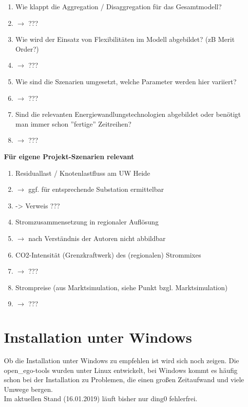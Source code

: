 \documentclass[
a4paper,     %
12pt         %
]{scrartcl}  %
\begin{document}
\begin{enumerate}
	\item Wie klappt die Aggregation / Disaggregation für das Gesamtmodell?
	\item[] $\rightarrow$ ???
	\item Wie wird der Einsatz von Flexibilitäten im Modell abgebildet? (zB Merit Order?)
	\item[] $\rightarrow$ ???
	\item Wie sind die Szenarien umgesetzt, welche Parameter werden hier variiert?
	\item[] $\rightarrow$ ???
	\item Sind die relevanten Energiewandlungstechnologien abgebildet oder benötigt man immer schon ''fertige'' Zeitreihen?
	\item[] $\rightarrow$ ???
\end{enumerate}


\textbf{Für eigene Projekt-Szenarien relevant}
\begin{enumerate}
	\item Residuallast / Knotenlastfluss am UW Heide
	\item[] $\rightarrow$ ggf. für entsprechende Substation ermittelbar
	\item[] -> Verweis ???

	\item Stromzusammensetzung in regionaler Auflösung
	\item[] $\rightarrow$ nach Verständnis der Autoren nicht abbildbar
	\item  CO2-Intensität (Grenzkraftwerk) des (regionalen) Strommixes
	\item[] $\rightarrow$ ???
	\item Strompreise (aus Marktsimulation, siehe Punkt bzgl. Marktsimulation)
	\item[] $\rightarrow$ ???


\end{enumerate}

\section{Installation unter Windows}
Ob die Installation unter Windows zu empfehlen ist wird sich noch zeigen. Die open\_ego-tools wurden unter Linux entwickelt, bei Windows kommt es häufig schon bei der Installation zu Problemen, die einen gro{\ss}en Zeitaufwand und viele Umwege bergen.\\
Im aktuellen Stand (16.01.2019) l\"auft bisher nur ding0 fehlerfrei.
\end{document}
